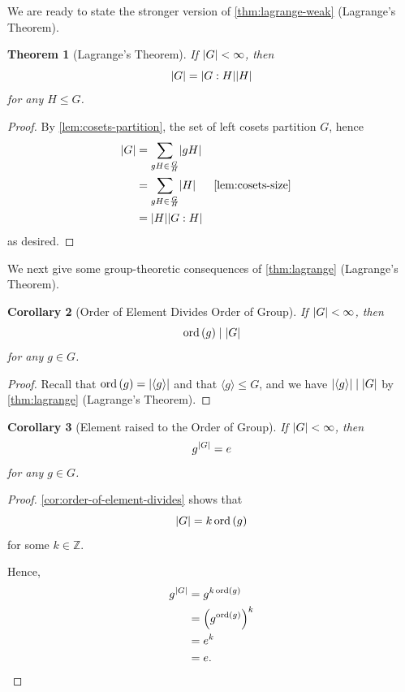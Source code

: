 \documentclass{article}
\newtheorem{theorem}{Theorem}[section]
\newtheorem{corollary}[theorem]{Corollary}
\theoremstyle{definition}
\theoremstyle{remark}
\DeclarePairedDelimiter{\abs}{\lvert}{\rvert}
\newcommand{\pqty}[1]{\left(#1\right)}
\newcommand{\angBrac}[1]{\langle #1\rangle}
\newcommand{\flatfrac}[2]{\frac{#1}{#2}}
\newcommand{\subgroup}{\leq}
\newcommand{\divides}{\mid}
\newcommand{\ZZ}{\mathbb{Z}}
\newcommand{\ord}{\operatorname{ord}}
\begin{document}
We are ready to state the stronger version of \autoref{thm:lagrange-weak} (Lagrange's Theorem).

\begin{theorem}[Lagrange's Theorem]
    \label{thm:lagrange}%
    If \(\abs{G} < \infty\), then
    \[
        \abs{G} = \abs{G : H} \abs{H}
    \]
    for any \(H \subgroup G\).
\end{theorem}

\begin{proof}
    By \autoref{lem:cosets-partition}, the set of left cosets partition \(G\), hence
    \begin{align*}
        \abs{G} &= \sum_{gH \in \flatfrac{G}{H}} \abs{gH} \\
        &= \sum_{gH \in \flatfrac{G}{H}} \abs{H} && \text{\autoref{lem:cosets-size}} \\
        &= \abs{H} \abs{G : H}
    \end{align*}
    as desired.
\end{proof}

We next give some group-theoretic consequences of \autoref{thm:lagrange} (Lagrange's Theorem).

\begin{corollary}[Order of Element Divides Order of Group]
    \label{cor:order-of-element-divides}%
    If \(\abs{G} < \infty\), then
    \[
        \ord\pqty{g} \divides \abs{G}
    \]
    for any \(g \in G\).
\end{corollary}

\begin{proof}
    Recall that \(\ord\pqty{g} = \abs{\angBrac{g}}\) and that \(\angBrac{g} \subgroup G\), and we have \(\abs{\angBrac{g}} \divides \abs{G}\) by \autoref{thm:lagrange} (Lagrange's Theorem).
\end{proof}

\begin{corollary}[Element raised to the Order of Group]
    \label{cor:element-to-order}%
    If \(\abs{G} < \infty\), then
    \[
        g^{\abs{G}} = e
    \]
    for any \(g \in G\).
\end{corollary}

\begin{proof}
    \autoref{cor:order-of-element-divides} shows that
    \[
        \abs{G} = k \ord \pqty{g}
    \]
    for some \(k \in \ZZ\).

    Hence,
    \begin{align*}
        g^{\abs{G}} &= g^{k \ord \pqty{g}} \\
        &= \pqty{g^{\ord \pqty{g}}}^{k} \\
        &= e^k \\
        &= e.
    \end{align*}
\end{proof}
\end{document}
